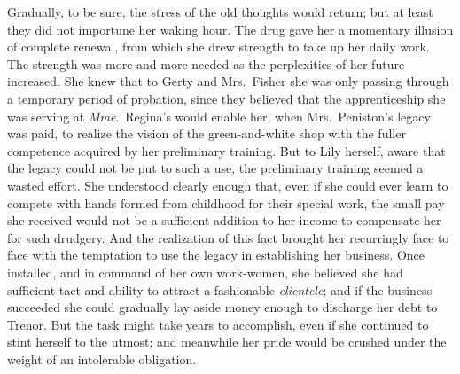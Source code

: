 \documentclass[12pt,a4paper]{book}
\begin{document}
Gradually, to be sure, the stress of the old thoughts would
return; but at least they did not importune her waking hour. The
drug gave her a momentary illusion of complete renewal, from
which she drew strength to take up her daily work. The strength
was more and more needed as the perplexities of her future
increased. She knew that to Gerty and Mrs.\ Fisher she was only
passing through a temporary period of probation, since they
believed that the apprenticeship she was serving at \textit{Mme}.\ Regina's
would enable her, when Mrs.\ Peniston's legacy was paid, to
realize the vision of the green-and-white shop with the fuller
competence acquired by her preliminary training. But to Lily
herself, aware that the legacy could not be put to such a use,
the preliminary training seemed a wasted effort. She understood
clearly enough that, even if she could ever learn to compete with
hands formed from childhood for their special work, the small pay
she received would not be a sufficient addition to her income to
compensate her for such drudgery. And the realization of this
fact brought her recurringly face to face with the temptation to
use the legacy in establishing her business. Once installed, and
in command of her own work-women, she believed she had sufficient
tact and ability to attract a fashionable \textit{clientele}; and if the
business succeeded she could gradually lay aside money enough to
discharge her debt to Trenor. But the task might take years to
accomplish, even if she continued to stint herself to the utmost;
and meanwhile her pride would be crushed under the weight of an
intolerable obligation.
\end{document}
